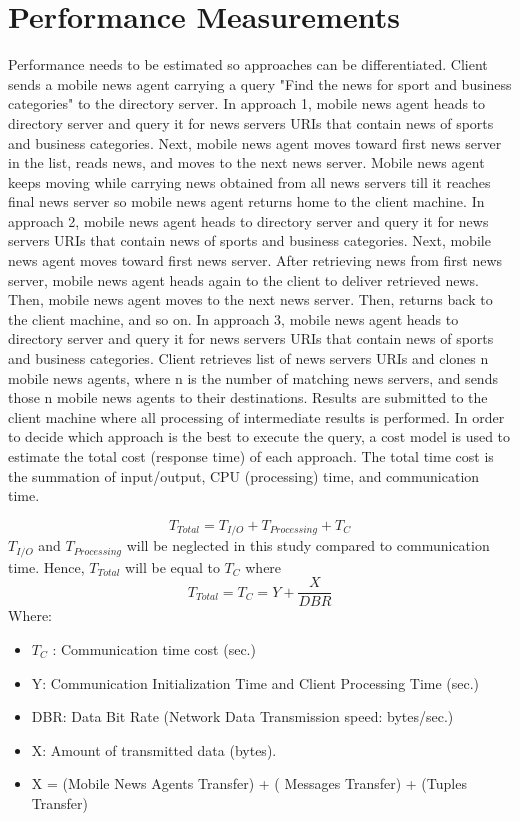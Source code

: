 \documentclass[12pt,a4paper,final,twoside,onecolumn,titlepage]{book}
\begin{document}
\section{Performance Measurements}
Performance needs to be estimated so approaches can be differentiated. Client sends a mobile news agent carrying a query "Find the news for sport and business categories" to the directory server. In approach 1, mobile news agent heads to directory server and query it for news servers URIs that contain news of sports and business categories. Next, mobile news agent moves toward first news server in the list, reads news, and moves to the next news server. Mobile news agent keeps moving while carrying news obtained from all news servers till it reaches final news server so mobile news agent returns home to the client machine. In approach 2, mobile news agent heads to directory server and query it for news servers URIs that contain news of sports and business categories. Next, mobile news agent moves toward first news server. After retrieving news from first news server, mobile news agent heads again to the client to deliver retrieved news. Then, mobile news agent moves to the next news server. Then, returns back to the client machine, and so on. In approach 3, mobile news agent heads to directory server and query it for news servers URIs that contain news of sports and business categories. Client retrieves list of news servers URIs and clones n mobile news agents, where n is the number of matching news servers, and sends those n mobile news agents to their destinations. Results are submitted to the client machine where all processing of intermediate results is performed. In order to decide which approach is the best to execute the query, a cost model is used to estimate the total cost (response time) of each approach. The total time cost is the summation of input/output, CPU (processing) time, and communication time.

\begin{equation}
T_{Total} = T_{I/O} + T_{Processing} + T_{C}
\end{equation}
$T_{I/O}$ and $T_{Processing}$ will be neglected in this study compared to communication time.
Hence, $T_{Total}$  will be equal to $T_{C}$ where
\begin{equation}
T_{Total} = T_{C} = Y + \frac{X}{DBR} 
\end{equation}
Where:
\begin{itemize}
\item $T_{C}$ : Communication time cost (sec.)
\item Y: Communication Initialization Time and Client Processing Time (sec.)
\item DBR: Data Bit Rate (Network Data Transmission speed: bytes/sec.)
\item X: Amount of transmitted data (bytes).
\item X = (Mobile News Agents Transfer) + ( Messages Transfer) + (Tuples Transfer)
\end{itemize}
\end{document}
